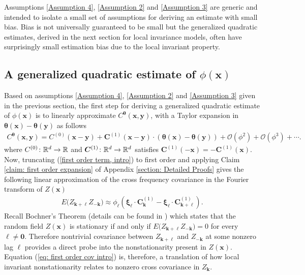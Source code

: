 \documentclass[10pt,noinfoline]{imsart}
\newcommand{\bs}{\boldsymbol}
\begin{document}
Assumptions \ref{Assumption 4}, \ref{Assumption 2} and \ref{Assumption 3} are generic and intended to isolate a small set of  assumptions for deriving an estimate with small bias. Bias is not universally guaranteed to be small but the generalized quadratic estimates, derived in the next section for  local invariance models, often have surprisingly small estimation bias due to the local invariant property.

\subsection{
A generalized quadratic estimate of $\phi(\bs x)$
}\label{Section: the quad est}

Based on assumptions \ref{Assumption 4}, \ref{Assumption 2} and \ref{Assumption 3} given in the previous section, the first step for deriving a generalized quadratic estimate of $\phi(\bs x)$ is to linearly approximate  $C^{\bs \theta}(\bs x,\bs y)$, with a Taylor expansion in $\bs \theta(\bs x) - \bs \theta(\bs y)$ as follows 
\begin{align}
\label{first order term, intro}
C^{\bs \theta}(\bs x,\bs y) = C^{(0)}(\bs x-\bs y)
        + \bs C^{(1)}(\bs x-\bs y)\cdot \left({\bs\theta(\bs x)-\bs\theta(\bs y)}\right)
        + \mathcal O({\phi}^2)+ \mathcal O(\phi^3)+\cdots.
\end{align}
where $C^{(0)}\colon \Bbb R^d \rightarrow \Bbb R$ and $\bs C^{(1)}\colon \Bbb R^d \rightarrow \Bbb R^d$ satisfies $\bs C^{(1)}(-\bs x) = -\bs C^{(1)}(\bs x)$.
Now, truncating (\ref{first order term, intro}) to first order and applying Claim \ref{claim: first order expansion} of Appendix \ref{section: Detailed Proofs} gives the following linear approximation of the cross frequency covariance in the Fourier transform of $Z(\bs x)$
\begin{align}
\label{eq: first order cov intro}
E\big(Z_{\bs k+\bs \ell}Z_{-\bs k}\big)  \approx  \phi_{\bs\ell}\left({\bs\xi_{\bs\ell}\!\cdot\! \bs C^{(1)}_{\bs k} - \bs\xi_{\bs\ell}\!\cdot\! \bs C_{\bs k+\bs \ell}^{(1)}}\right).
\end{align}
Recall Bochner's Theorem (details can be found in \cite{Gikhman_Skorokhod_book_v1}) which states that the random field $Z(\bs x)$ is stationary if and only if  \mbox{$E\big(Z_{\bs k+\bs \ell}Z_{-\bs k}\big) = 0$} for every $\bs\ell \neq\bs 0$. Therefore nontrivial covariance between $Z_{\bs k+\bs \ell}$ and $Z_{-\bs k}$ at some nonzero lag $\bs\ell$ provides a direct probe into the nonstationarity present in $Z(\bs x)$. Equation (\ref{eq: first order cov intro}) is, therefore, a translation of how local invariant nonstationarity relates to nonzero cross covariance in $Z_{\bs k}$.
\end{document}
